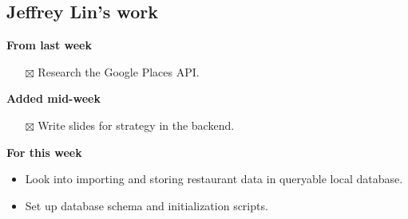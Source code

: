 \documentclass[12pt,letterpaper]{article}
\newcommand{\done}{$\boxtimes$}
\begin{document}
\subsection*{Jeffrey Lin's work}

\textbf{From last week}
\begin{itemize}
  \item[\done] Research the Google Places API.
\end{itemize}

\textbf{Added mid-week}
\begin{itemize}
  \item[\done] Write slides for strategy in the backend.
\end{itemize}

\textbf{For this week}
\begin{itemize}
  \item Look into importing and storing restaurant data in queryable local database.
  \item Set up database schema and initialization scripts.
\end{itemize}
\end{document}
